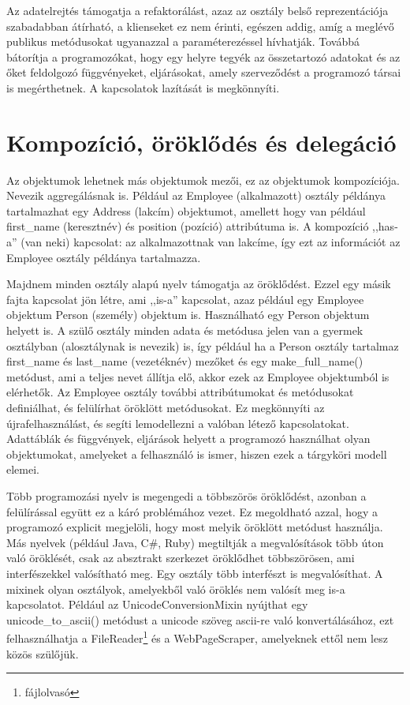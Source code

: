 \documentclass[]{thesis-ekf}
\theoremstyle{definition}
\begin{document}
	Az adatelrejtés támogatja a refaktorálást, azaz az osztály belső reprezentációja szabadabban átírható, a klienseket ez nem érinti, egészen addig, amíg a meglévő publikus metódusokat ugyanazzal a paraméterezéssel hívhatják. Továbbá bátorítja a programozókat, hogy egy helyre tegyék az összetartozó adatokat és az őket feldolgozó függvényeket, eljárásokat, amely szerveződést a programozó társai is megérthetnek. A kapcsolatok lazítását is megkönnyíti.
	
	\section{Kompozíció, öröklődés és delegáció}
	Az objektumok lehetnek más objektumok mezői, ez az objektumok kompozíciója. Nevezik aggregálásnak is. Például az Employee (alkalmazott) osztály példánya tartalmazhat egy Address (lakcím) objektumot, amellett hogy van például first\_name (keresztnév) és position (pozíció) attribútuma is. A kompozíció ,,has-a'' (van neki) kapcsolat: az alkalmazottnak van lakcíme, így ezt az információt az Employee osztály példánya tartalmazza.
	
	Majdnem minden osztály alapú nyelv támogatja az öröklődést. Ezzel egy másik fajta kapcsolat jön létre, ami ,,is-a'' kapcsolat, azaz például egy Employee objektum Person (személy) objektum is. Használható egy Person objektum helyett is. A szülő osztály minden adata és metódusa jelen van a gyermek osztályban (alosztálynak is nevezik) is, így például ha a Person osztály tartalmaz first\_name és last\_name (vezetéknév) mezőket és egy make\_full\_name() metódust, ami a teljes nevet állítja elő, akkor ezek az Employee objektumból is elérhetők. Az Employee osztály további attribútumokat és metódusokat definiálhat, és felülírhat öröklött metódusokat. Ez megkönnyíti az újrafelhasználást, és segíti lemodellezni a valóban létező kapcsolatokat. Adattáblák és függvények, eljárások helyett a programozó használhat olyan objektumokat, amelyeket a felhasználó is ismer, hiszen ezek a tárgyköri modell elemei.\cite{Jacobsen}
	
	Több programozási nyelv is megengedi a többszörös öröklődést, azonban a felülírással együtt ez a káró problémához vezet. Ez megoldható azzal, hogy a programozó explicit megjelöli, hogy most melyik öröklött metódust használja. Más nyelvek (például Java, C\#, Ruby) megtiltják a megvalósítások több úton való öröklését, csak az absztrakt szerkezet öröklődhet többszörösen, ami interfészekkel valósítható meg. Egy osztály több interfészt is megvalósíthat. A mixinek olyan osztályok, amelyekből való öröklés nem valósít meg is-a kapcsolatot. Például az UnicodeConversionMixin nyújthat egy unicode\_to\_ascii() metódust a unicode szöveg ascii-re való konvertálásához, ezt felhasználhatja a FileReader\footnote{fájlolvasó} és a WebPageScraper, amelyeknek ettől nem lesz közös szülőjük.
	
\end{document}
